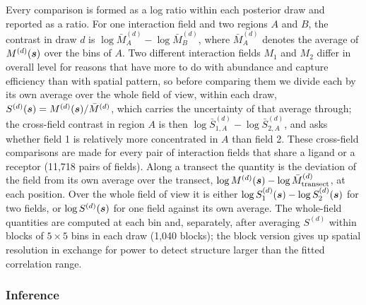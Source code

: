 \documentclass[10pt,letterpaper]{article}
\begin{document}
Every comparison is formed as a log ratio within each posterior draw and reported as a ratio. For one interaction field and two regions $A$ and $B$, the contrast in draw $d$ is $\log \bar{M}^{(d)}_A - \log \bar{M}^{(d)}_B$, where $\bar{M}^{(d)}_A$ denotes the average of $M^{(d)}(\mbox{\boldmath $s$})$ over the bins of $A$. Two different interaction fields $M_1$ and $M_2$ differ in overall level for reasons that have more to do with abundance and capture efficiency than with spatial pattern, so before comparing them we divide each by its own average over the whole field of view, within each draw, $S^{(d)}(\mbox{\boldmath $s$}) = M^{(d)}(\mbox{\boldmath $s$}) / \bar{M}^{(d)}$, which carries the uncertainty of that average through; the cross-field contrast in region $A$ is then $\log \bar{S}^{(d)}_{1,A} - \log \bar{S}^{(d)}_{2,A}$, and asks whether field 1 is relatively more concentrated in $A$ than field 2. These cross-field comparisons are made for every pair of interaction fields that share a ligand or a receptor (11,718 pairs of fields). Along a transect the quantity is the deviation of the field from its own average over the transect, $\log M^{(d)}(\mbox{\boldmath $s$}) - \log \bar{M}^{(d)}_{\text{transect}}$, at each position. Over the whole field of view it is either $\log S_1^{(d)}(\mbox{\boldmath $s$}) - \log S_2^{(d)}(\mbox{\boldmath $s$})$ for two fields, or $\log S^{(d)}(\mbox{\boldmath $s$})$ for one field against its own average. The whole-field quantities are computed at each bin and, separately, after averaging $S^{(d)}$ within blocks of $5 \times 5$ bins in each draw (1,040 blocks); the block version gives up spatial resolution in exchange for power to detect structure larger than the fitted correlation range.

\subsubsection*{Inference}
\end{document}
